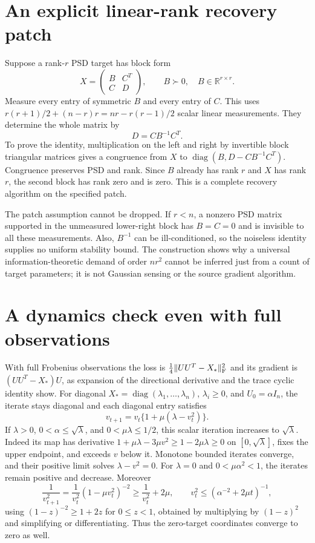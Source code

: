 \documentclass[11pt]{article}
\begin{document}
\section{An explicit linear-rank recovery patch}
Suppose a rank-$r$ PSD target has block form
\[
 X=\begin{pmatrix}B&C^T\\C&D\end{pmatrix},\qquad B\succ0,
 \quad B\in\mathbb R^{r\times r}.
\]
Measure every entry of symmetric $B$ and every entry of $C$.
This uses
$r(r+1)/2+(n-r)r=nr-r(r-1)/2$ scalar linear measurements.
They determine the whole matrix by
\[
 D=CB^{-1}C^T.
\]
To prove the identity, multiplication on the left and right by
invertible block triangular matrices gives a congruence from
$X$ to $\operatorname{diag}(B,D-CB^{-1}C^T)$. Congruence
preserves PSD and rank. Since $B$ already has rank $r$ and
$X$ has rank $r$, the second block has rank zero and is zero.
This is a complete recovery algorithm on the specified patch.

The patch assumption cannot be dropped. If $r<n$, a nonzero
PSD matrix supported in the unmeasured lower-right block has
$B=C=0$ and is invisible to all these measurements. Also,
$B^{-1}$ can be ill-conditioned, so the noiseless identity
supplies no uniform stability bound. The construction shows
why a universal information-theoretic demand of order $nr^2$
cannot be inferred just from a count of target parameters;
it is not Gaussian sensing or the source gradient algorithm.

\section{A dynamics check even with full observations}
With full Frobenius observations the loss is
$\tfrac14\|UU^T-X_*\|_{\rm F}^2$ and its gradient is
$(UU^T-X_*)U$, as expansion of the directional derivative
and the trace cyclic identity show. For diagonal
$X_*=\operatorname{diag}(\lambda_1,\ldots,\lambda_n)$,
$\lambda_i\ge0$, and $U_0=\alpha I_n$, the iterate stays
diagonal and each diagonal entry satisfies
\[
 v_{t+1}=v_t\{1+\mu(\lambda-v_t^2)\}.
\]
If $\lambda>0$, $0<\alpha\le\sqrt\lambda$, and
$0<\mu\lambda\le1/2$, this scalar iteration increases to
$\sqrt\lambda$. Indeed its map has derivative
$1+\mu\lambda-3\mu v^2\ge1-2\mu\lambda\ge0$ on
$[0,\sqrt\lambda]$, fixes the upper endpoint, and exceeds
$v$ below it. Monotone bounded iterates converge, and their
positive limit solves $\lambda-v^2=0$.
For $\lambda=0$ and $0<\mu\alpha^2<1$, the iterates remain
positive and decrease. Moreover
\[
 \frac1{v_{t+1}^2}
 =\frac1{v_t^2}(1-\mu v_t^2)^{-2}
 \ge\frac1{v_t^2}+2\mu,
 \qquad v_t^2\le(\alpha^{-2}+2\mu t)^{-1},
\]
using $(1-z)^{-2}\ge1+2z$ for $0\le z<1$, obtained by
multiplying by $(1-z)^2$ and simplifying or differentiating.
Thus the zero-target coordinates converge to zero as well.
\end{document}

